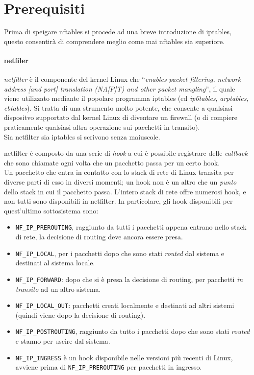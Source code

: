\section{Prerequisiti}
Prima di speigare nftables si procede ad una breve introduzione di iptables,
questo consentirà di comprendere meglio come mai nftables sia superiore.

\paragraph{netfiler}
\textit{netfilter} è il componente del kernel Linux che
``\textit{enables packet filtering, network address [and port] translation
(NA[P]T) and other packet mangling}'', il quale viene utilizzato mediante il
popolare programma iptables (ed \textit{ip6tables}, \textit{arptables},
\textit{ebtables}). Si tratta di una strumento molto
potente, che consente a qualsiasi dispositvo supportato dal kernel Linux
di diventare un firewall (o di compiere praticamente qualsiasi altra operazione
sui pacchetti in transito).\\
Sia netfilter sia iptables si scrivono senza maiuscole.


netfilter è composto da una serie di \textit{hook} a cui è possibile registrare
delle \textit{callback} che sono chiamate ogni volta che un pacchetto passa per
un certo hook.\\
Un pacchetto che entra in contatto con lo stack di rete di Linux transita per
diverse parti di esso in diversi momenti; un hook non è un altro che un \textit{punto} dello stack
in cui il pacchetto passa.
L'intero stack di rete offre numerosi hook, e non tutti sono disponibili in netfilter.
In particolare, gli hook disponibili per quest'ultimo sottosistema sono:
\begin{itemize}
  \item \texttt{NF\_IP\_PREROUTING}, raggiunto da tutti i pacchetti appena entrano nello
  stack di rete, la decisione di routing deve ancora essere presa.
  \item \texttt{NF\_IP\_LOCAL}, per i pacchetti dopo che sono stati \textit{routed}
  dal sistema e destinati al sistema locale.
  \item \texttt{NF\_IP\_FORWARD}: dopo che si è presa la decisione di routing,
  per pacchetti \textit{in transito} ad un altro sistema.
  \item \texttt{NF\_IP\_LOCAL\_OUT}: pacchetti creati localmente e destinati ad
  altri sistemi (quindi viene dopo la decisione di routing).
  \item \texttt{NF\_IP\_POSTROUTING}, raggiunto da tutto i pacchetti dopo che
  sono stati \textit{routed} e stanno per uscire dal sistema.
  \item \texttt{NF\_IP\_INGRESS} è un hook disponibile nelle versioni più recenti di
  Linux, avviene prima di \texttt{NF\_IP\_PREROUTING} per pacchetti in ingresso.
\end{itemize}

